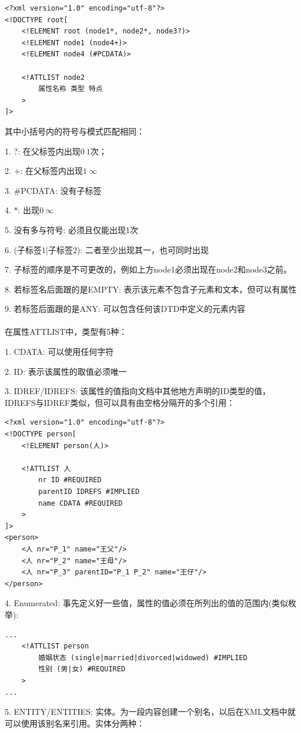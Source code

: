 \documentclass[fontset=windows]{article}
\begin{document}
\begin{verbatim}
<?xml version="1.0" encoding="utf-8"?>
<!DOCTYPE root[
	<!ELEMENT root (node1*, node2*, node3?)>
	<!ELEMENT node1 (node4+)>
	<!ELEMENT node4 (#PCDATA)>

	<!ATTLIST node2
		属性名称 类型 特点
	>
]>
\end{verbatim}

\noindent 其中小括号内的符号与模式匹配相同：

1. $?$: 在父标签内出现$0~1$次；

2. $+$: 在父标签内出现$1~\infty$

3. \#PCDATA: 没有子标签

4. $*$: 出现$0~\infty$

5. 没有多与符号: 必须且仅能出现1次

6. (子标签1|子标签2): 二者至少出现其一，也可同时出现

7. 子标签的顺序是不可更改的，例如上方node1必须出现在node2和node3之前。

8. 若标签名后面跟的是EMPTY: 表示该元素不包含子元素和文本，但可以有属性

9. 若标签后面跟的是ANY: 可以包含任何该DTD中定义的元素内容
\\
\\
在属性ATTLIST中，类型有5种：

1. CDATA: 可以使用任何字符

2. ID: 表示该属性的取值必须唯一

3. IDREF/IDREFS: 该属性的值指向文档中其他地方声明的ID类型的值，IDREFS与IDREF类似，但可以具有由空格分隔开的多个引用：

\begin{verbatim}
<?xml version="1.0" encoding="utf-8"?>
<!DOCTYPE person[
	<!ELEMENT person(人)>

	<!ATTLIST 人
		nr ID #REQUIRED
		parentID IDREFS #IMPLIED
		name CDATA #REQUIRED	
	>
]>
<person>
	<人 nr="P_1" name="王父"/>
	<人 nr="P_2" name="王母"/>
	<人 nr="P_3" parentID="P_1 P_2" name="王仔"/>
</person>
\end{verbatim}

4. Enumerated: 事先定义好一些值，属性的值必须在所列出的值的范围内(类似枚举):

\begin{verbatim}
...
	<!ATTLIST person
		婚姻状态 (single|married|divorced|widowed) #IMPLIED
		性别 (男|女) #REQUIRED
	>
...
\end{verbatim}

5. ENTITY/ENTITIES: 实体。为一段内容创建一个别名，以后在XML文档中就可以使用该别名来引用。实体分两种：
\end{document}
